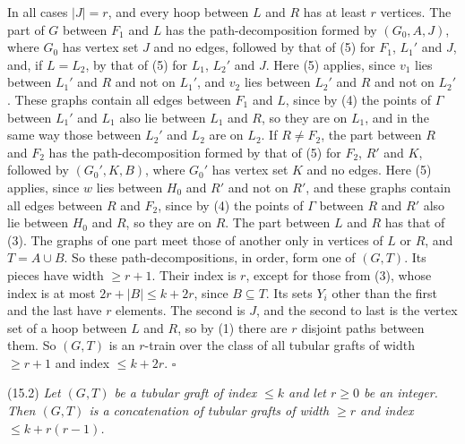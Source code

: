 {In all cases $|J| = r$, and every hoop between $L$ and $R$ has at least $r$ vertices. The part of $G$ between $F_1$ and $L$ has the path-decomposition formed by $(G_0, A, J)$, where $G_0$ has vertex set $J$ and no edges, followed by that of (5) for $F_1$, $L_1'$ and $J$, and, if $L = L_2$, by that of (5) for $L_1$, $L_2'$ and $J$. Here (5) applies, since $v_1$ lies between $L_1'$ and $R$ and not on $L_1'$, and $v_2$ lies between $L_2'$ and $R$ and not on $L_2'$. These graphs contain all edges between $F_1$ and $L$, since by (4) the points of $\Gamma$ between $L_1'$ and $L_1$ also lie between $L_1$ and $R$, so they are on $L_1$, and in the same way those between $L_2'$ and $L_2$ are on $L_2$. If $R \ne F_2$, the part between $R$ and $F_2$ has the path-decomposition formed by that of (5) for $F_2$, $R'$ and $K$, followed by $(G_0', K, B)$, where $G_0'$ has vertex set $K$ and no edges. Here (5) applies, since $w$ lies between $H_0$ and $R'$ and not on $R'$, and these graphs contain all edges between $R$ and $F_2$, since by (4) the points of $\Gamma$ between $R$ and $R'$ also lie between $H_0$ and $R$, so they are on $R$. The part between $L$ and $R$ has that of (3). The graphs of one part meet those of another only in vertices of $L$ or $R$, and $T = A \cup B$. So these path-decompositions, in order, form one of $(G, T)$. Its pieces have width $\ge r + 1$. Their index is $r$, except for those from (3), whose index is at most $2r + |B| \le k + 2r$, since $B \subseteq T$. Its sets $Y_i$ other than the first and the last have $r$ elements. The second is $J$, and the second to last is the vertex set of a hoop between $L$ and $R$, so by (1) there are $r$ disjoint paths between them. So $(G, T)$ is an $r$-train over the class of all tubular grafts of width $\ge r + 1$ and index $\le k + 2r$. $\square$}

\stmt
(15.2) \textit{Let $(G, T)$ be a tubular graft of index $\le k$ and let $r \ge 0$ be an integer. Then $(G, T)$ is a concatenation of tubular grafts of width $\ge r$ and index $\le k + r(r - 1)$.}


